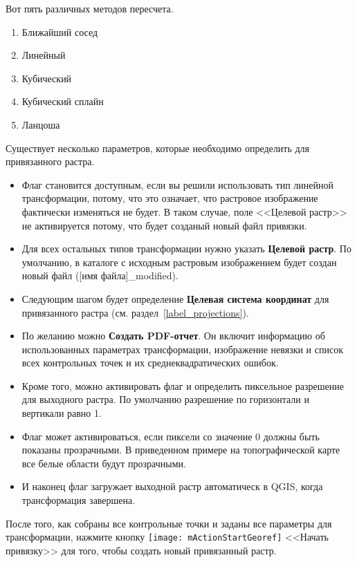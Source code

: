 Вот пять различных методов пересчета.

\begin{enumerate}
\item Ближайший сосед
\item Линейный
\item Кубический
\item Кубический сплайн
\item Ланцоша
\end{enumerate}


Существует несколько параметров, которые необходимо определить для
привязанного растра.

\begin{itemize}[label=--]
\item Флаг  становится доступным, если
вы решили использовать тип линейной трансформации, потому, что это
означает, что растровое изображение фактически изменяться не будет.
В таком случае, поле <<Целевой растр>> не активируется потому, что
будет созданый новый файл привязки.
\item Для всех остальных типов трансформации нужно указать
\textbf{Целевой растр}. По умолчанию, в каталоге с исходным растровым
изображением будет создан новый файл ([имя файла]\_modified).
\item Следующим шагом будет определение \textbf{Целевая система координат}
для привязанного растра (см. раздел~\ref{label_projections}).
\item По желанию можно \textbf{Создать PDF-отчет}. Он включит
информацию об использованных параметрах трансформации, изображение
невязки и список всех контрольных точек и их среднеквадратических ошибок.
\item Кроме того, можно активировать флаг
 и определить пиксельное разрешение
для выходного растра. По умолчанию разрешение по горизонтали и вертикали
равно 1.
\item Флаг 
может активироваться, если пиксели со значение 0 должны быть показаны
прозрачными. В приведенном примере на топографической карте все белые
области будут прозрачными.
\item И наконец флаг  загружает
выходной растр автоматическ в QGIS, когда трансформация завершена.
\end{itemize}

\label{georeferencer_running}

После того, как собраны все контрольные точки и заданы все параметры для
трансформации, нажмите кнопку \texttt{[image: mActionStartGeoref]}
<<Начать привязку>> для того, чтобы создать новый привязанный растр.
